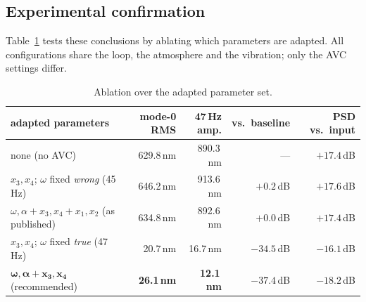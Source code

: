 \documentclass[11pt]{article}
\newcommand{\SI}[2]{#1\,#2}
\begin{document}




\subsection{Experimental confirmation}
\label{sec:expconf}

Table~\ref{tab:abl} tests these conclusions by ablating which parameters are adapted.
%
All configurations share the loop, the atmosphere and the vibration; only the AVC settings differ.

\begin{table}
\centering\small
\begin{tabular}{lrrrr}
\toprule
adapted parameters & mode-0 RMS & \SI{47}{Hz} amp. & vs.\ baseline & PSD vs.\ input\\
\midrule
none (no AVC)                                        & \SI{629.8}{nm} & \SI{890.3}{nm} & ---        & $+17.4$\,dB\\
$x_3,x_4$; $\omega$ fixed \emph{wrong} (\SI{45}{Hz}) & \SI{646.2}{nm} & \SI{913.6}{nm} & $+0.2$\,dB & $+17.6$\,dB\\
$\omega,\alpha+x_3,x_4+x_1,x_2$ (as published)       & \SI{634.8}{nm} & \SI{892.6}{nm} & $+0.0$\,dB & $+17.4$\,dB\\
$x_3,x_4$; $\omega$ fixed \emph{true} (\SI{47}{Hz})  & \SI{20.7}{nm}  & \SI{16.7}{nm}  & $-34.5$\,dB & $-16.1$\,dB\\
$\boldsymbol{\omega,\alpha+x_3,x_4}$ (recommended)   & \textbf{\SI{26.1}{nm}} & \textbf{\SI{12.1}{nm}} & $\mathbf{-37.4}$\,dB & $\mathbf{-18.2}$\,dB\\
\bottomrule
\end{tabular}
\caption{Ablation over the adapted parameter set.}
\label{tab:abl}
\end{table}
\end{document}
